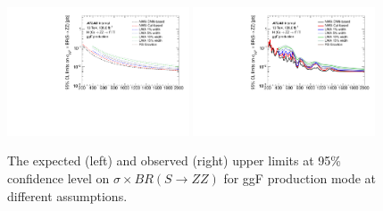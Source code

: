 \begin{figure}[h]
    \centering
    \includegraphics[width=0.48\textwidth]{figures/HMHZZ/results/4l_compareAll_exp.pdf}
    \includegraphics[width=0.48\textwidth]{figures/HMHZZ/results/4l_compareAll_obs.pdf}
    \caption{The expected (left) and observed (right) upper limits at 95\% confidence level on $\sigma \times BR(S\to ZZ)$ for ggF production mode at different assumptions. }
    \label{fig:models_limits}
\end{figure}
